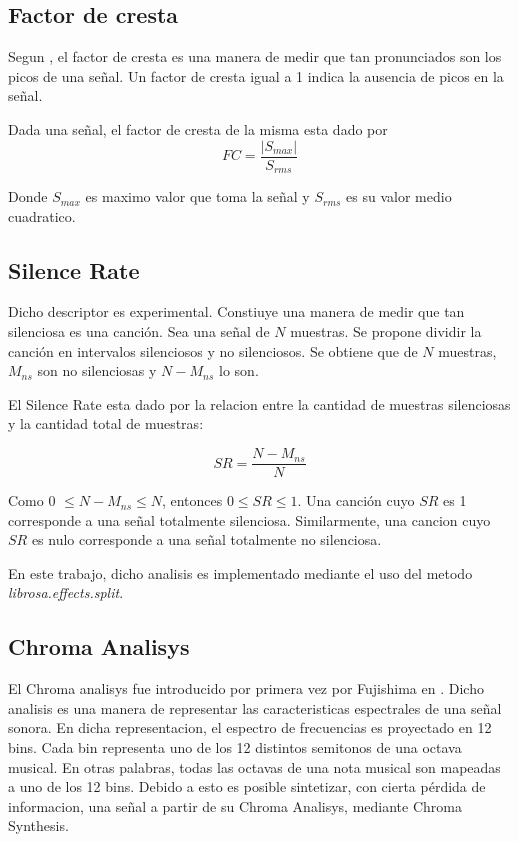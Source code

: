 \documentclass[]{article}
\begin{document}
\begin{multicols}{2}
\subsection{Factor de cresta}
Segun \cite{ wiki:crest}{}, el factor de cresta es una manera de medir que tan
pronunciados son los picos de una señal. Un factor de cresta igual a 1 indica
la ausencia de picos en la señal.

Dada una señal, el factor de cresta de la misma esta dado por
\begin{equation*}
  FC=\frac{\left|S_{max}\right|}{S_{rms}}
\end{equation*}

Donde $S_{max}$ es maximo valor que toma la señal y $S_{rms}$ es su valor medio
cuadratico.


\subsection{Silence Rate}
Dicho descriptor es experimental. Constiuye una manera de medir que tan
silenciosa es una canción. Sea una señal de $N$ muestras. Se propone dividir la
canción en intervalos silenciosos y no silenciosos. Se obtiene que de $N$ muestras,
$M_{ns}$ son no silenciosas y $N-M_{ns}$ lo son.

El Silence Rate esta dado por la relacion entre la cantidad de muestras
silenciosas y la cantidad total de muestras:

\begin{equation*}
  SR=\frac{N-M_{ns}}{N}
\end{equation*}

Como  0 $\leq N-M_{ns}\leq N$, entonces $0 \leq SR \leq 1$.
Una canción cuyo $SR$ es 1 corresponde a una señal totalmente silenciosa.
Similarmente, una cancion cuyo $SR$ es nulo corresponde a una señal totalmente
no silenciosa.

En este trabajo, dicho analisis es implementado mediante el uso del metodo
\emph{{librosa.effects.split}}.

\subsection{Chroma Analisys}
\label{Sec:Chroma}
El Chroma analisys fue introducido por primera vez por Fujishima en \cite{fujishima1999realtime}.
Dicho analisis es una manera de representar las caracteristicas espectrales
de una señal sonora. En dicha representacion, el espectro de frecuencias es
proyectado en 12 bins. Cada bin representa uno de los 12 distintos semitonos
de una octava musical. En otras palabras, todas las octavas de una nota musical
son mapeadas a uno de los 12 bins. Debido a esto es posible sintetizar, con cierta
pérdida de informacion, una señal a partir de su Chroma Analisys, mediante Chroma
Synthesis.


\end{multicols}
\end{document}
